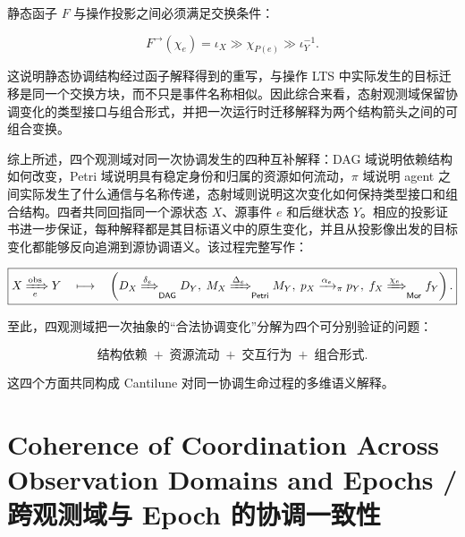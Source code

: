   静态函子 $F$ 与操作投影之间必须满足交换条件：

  \begin{equation}
    \boxed{
      F^{\to}(\chi_e)
      =
      \iota_X
      \mathbin{\gg}
      \chi_{P(e)}
      \mathbin{\gg}
      \iota_Y^{-1}.
    }
    \label{eq:morphism-functorial-commutation}
  \end{equation}

  这说明静态协调结构经过函子解释得到的重写，与操作 LTS 中实际发生的目标迁移是同一个交换方块，而不只是事件名称相似。因此综合来看，态射观测域保留协调变化的类型接口与组合形式，并把一次运行时迁移解释为两个结构箭头之间的可组合变换。

  综上所述，四个观测域对同一次协调发生的四种互补解释：DAG 域说明依赖结构如何改变，Petri 域说明具有稳定身份和归属的资源如何流动，$\pi$ 域说明 agent 之间实际发生了什么通信与名称传递，态射域则说明这次变化如何保持类型接口和组合结构。四者共同回指同一个源状态 $X$、源事件 $e$ 和后继状态 $Y$。相应的投影证书进一步保证，每种解释都是其目标语义中的原生变化，并且从投影像出发的目标变化都能够反向追溯到源协调语义。该过程完整写作：

  \begin{equation}
    \boxed{
      X\xRightarrow[e]{\mathrm{obs}}Y
      \quad\longmapsto\quad
      \left(
        D_X\xRightarrow{\delta_e}_{\mathsf{DAG}}D_Y,\;
        M_X\xRightarrow{\Delta_e}_{\mathsf{Petri}}M_Y,\;
        p_X\xrightarrow{\alpha_e}_{\pi}p_Y,\;
        f_X\xRightarrow{\chi_e}_{\mathsf{Mor}}f_Y
      \right).
    }
    \label{eq:four-domain-projection-summary}
  \end{equation}

  至此，四观测域把一次抽象的“合法协调变化”分解为四个可分别验证的问题：

  \begin{equation}
    \boxed{
      \text{结构依赖}
      \;+\;
      \text{资源流动}
      \;+\;
      \text{交互行为}
      \;+\;
      \text{组合形式}.
    }
    \label{eq:four-observation-decomposition}
  \end{equation}

  这四个方面共同构成 Cantilune 对同一协调生命过程的多维语义解释。



  \section{Coherence of Coordination Across Observation Domains and Epochs /
  跨观测域与 Epoch 的协调一致性}


